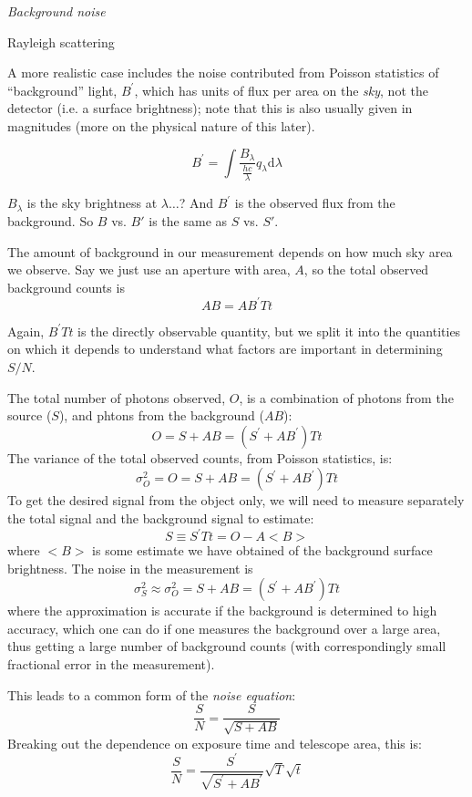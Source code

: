 \documentclass[12pt]{article}
\begin{document}
\emph{Background noise}

\textcolor{myBlue}{Rayleigh scattering}

A more realistic case includes the noise contributed from Poisson
statistics of ``background'' light, $B^{\prime}$,
which has units of flux per area
on the \emph{sky}, not the detector
(i.e. a surface brightness); note that this is also usually
given in magnitudes (more on the physical nature of
this later).

    $$ B^{\prime} = \int \frac{B_{\lambda}}{\frac{hc}{\lambda}}
       q_{\lambda}\textrm{d}\lambda $$

\textcolor{myBlue}{$B_{\lambda}$ is the sky brightness at $\lambda
\ldots$? And $B^{\prime}$ is the observed flux from the background.
So $B$ vs. $B'$ is the same as $S$ vs. $S'$.}

The amount of background in our measurement depends on
how much sky area we observe. Say we just
use an aperture with area, $A$, so the total observed background counts
is
    $$ AB = AB^{\prime}Tt $$

Again, $B^{\prime}Tt$ is the directly observable quantity,
but we split it into the quantities on which it depends to understand
what factors are important in determining $S/N$.

The total number of photons observed, $O$, is a combination of
photons from the source ($S$), and phtons from the background ($AB$):
    $$ O = S + AB = (S^{\prime} + AB^{\prime})Tt $$
The variance of the total observed counts, from Poisson statistics,
is:
    $$ \sigma^2_O = O =  S + AB = (S^{\prime} + AB^{\prime})Tt $$
To get the desired signal from the object only, we will need to
measure separately the total signal and the background signal to
estimate:
    $$ S \equiv S^{\prime}Tt = O-A <B> $$
where $<B>$ is some estimate we have obtained of the background
surface brightness. The noise in the measurement is
    $$ \sigma^2_S \approx \sigma^2_O =
    S + AB = (S^{\prime} + AB^{\prime})Tt $$
where the approximation is accurate if the background is determined to
high accuracy, which one can do if one measures the background over a
large area, thus getting a large number of background counts (with
correspondingly small fractional error in the measurement).

This leads to a common form of the \emph{noise equation}:
    $$ \frac{S}{N} = \frac{S}{\sqrt{S+AB}}  $$
Breaking out the dependence on exposure time and telescope area, this
is:
    $$ \frac{S}{N} = \frac{S^{\prime}}
    {\sqrt{S^{\prime}+AB^{\prime}}}
    \sqrt{T}\sqrt{t}$$
\end{document}
